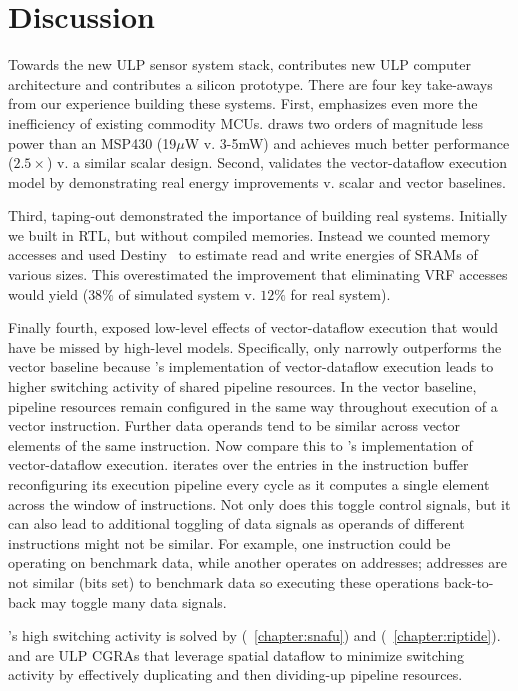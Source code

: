 \section{Discussion}
\label{manic:discuss}
Towards the new ULP sensor system stack, \manic contributes new ULP computer architecture and \msilicon contributes a silicon prototype.
% 
There are four key take-aways from our experience building these systems.
% 
First, \msilicon emphasizes even more the inefficiency of existing commodity MCUs.
% 
\manic draws two orders of magnitude less power than an MSP430 (19$\mu$W v. 3-5mW) and achieves much better performance ($2.5\times$) v. a similar scalar design.
% 
Second, \msilicon validates the vector-dataflow execution model by demonstrating real energy improvements v. scalar and vector baselines.


Third, taping-out \msilicon demonstrated the importance of building real systems.
% 
Initially we built \manic in RTL, but without compiled memories.
% 
Instead we counted memory accesses and used Destiny~\cite{destiny} to estimate read and write energies of SRAMs of various sizes.
% 
This overestimated the improvement that eliminating VRF accesses would yield ($38\%$ of simulated system v. $12\%$ for real system).

Finally fourth, \msilicon exposed low-level effects of vector-dataflow execution that would have be missed by high-level models.
% 
Specifically, \manic only narrowly outperforms the vector baseline because \manic's implementation of vector-dataflow execution leads to higher switching activity of shared pipeline resources.
% 
In the vector baseline, pipeline resources remain configured in the same way throughout execution of a vector instruction.
% 
Further data operands tend to be similar across vector elements of the same instruction.
% 
Now compare this to \manic's implementation of vector-dataflow execution.
% 
\manic iterates over the entries in the instruction buffer reconfiguring its execution pipeline every cycle as it computes a single element across the window of instructions.
% 
Not only does this toggle control signals, but it can also lead to additional toggling of data signals as operands of different instructions might not be similar.
% 
For example, one instruction could be operating on benchmark data, while another operates on addresses; addresses are not similar (bits set) to benchmark data so executing these operations back-to-back may toggle many data signals. 

\manic's high switching activity is solved by \snafu (~\autoref{chapter:snafu}) and \riptide (~\autoref{chapter:riptide}).
% 
\riptide and \snafu are ULP CGRAs that leverage spatial dataflow to minimize switching activity by effectively duplicating and then dividing-up pipeline resources.
